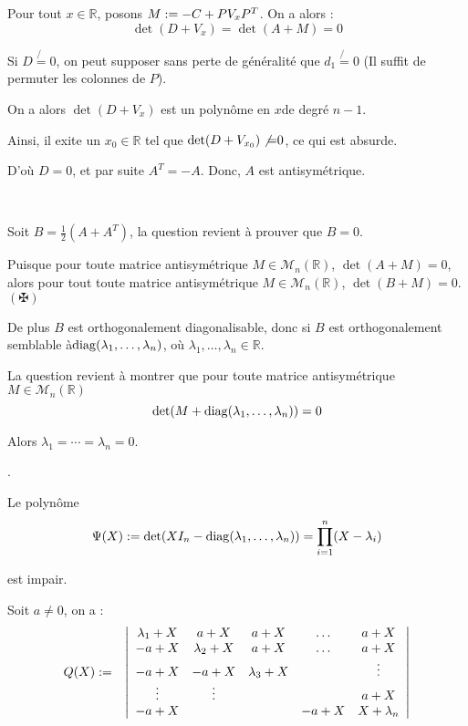 Pour tout $x \in \mathbb{R}$, posons $M := - C + P V_x P^T$. On a alors :
\[ \det (D + V_x) = \det (A + M) = 0 \]


Si $D \not{=} 0$, on peut supposer sans perte de g{\'e}n{\'e}ralit{\'e} que
$d_1 \not{=} 0$ (Il suffit de permuter les colonnes de $P$).

On a alors $\det (D + V_x)$ est un polyn{\^o}me en $x$de degr{\'e} $n - 1$.

Ainsi, il exite un $x_0 \in \mathbb{R}$ tel que $\det (D + V_{x_0})
\text{{\textsc{}}} \not{=} 0$, ce qui est absurde.

D'o{\`u} $D = 0$, et par suite $A^T = - A$. Donc, $A$ est antisym{\'e}trique.

\

{}

Soit $B = \frac{1}{2} (A + A^T)$, la question revient {\`a} prouver que $B =
0$.

Puisque pour toute matrice antisym{\'e}trique $M \in \mathcal{M}_n
(\mathbb{R})$, $\det (A + M) = 0$, alors pour tout toute matrice
antisym{\'e}trique $M \in \mathcal{M}_n (\mathbb{R})$, $\det (B + M) = 0$.
$(\maltese)$

De plus $B$ est orthogonalement diagonalisable, donc si $B$ est
orthogonalement semblable {\`a}\quad$\operatorname{diag} (\lambda_1, \ldots,
\lambda_n)$, o{\`u} $\lambda_1, \ldots, \lambda_n \in \mathbb{R}.$

La question revient {\`a} montrer que pour toute matrice antisym{\'e}trique $M
\in \mathcal{M}_n (\mathbb{R})$
\[ \det (M + \operatorname{diag} (\lambda_1, \ldots, \lambda_n)) = 0 \]


Alors $\lambda_1 = \cdots = \lambda_n = 0$.

.

Le polyn{\^o}me
\[ \Psi  (X) := \det (X I_n - \operatorname{diag} (\lambda_1, \ldots, \lambda_n))
   = \underset{i = 1}{\overset{n}{\prod}} (X - \lambda_i) \]


est impair.


Soit $a \neq 0$, on a :
\begin{eqnarray*}
  Q (X) & := & \left| \begin{array}{ccccc}
    \lambda_1 + X & a + X & a + X & \ldots & a + X\\
    - a + X & \lambda_2 + X & a + X & \ldots & a + X\\
    - a + X & - a + X & \lambda_3 + X &  & \vdots\\
    \vdots & \vdots &  &  & a + X\\
    - a + X &  &  & - a + X & X + \lambda_n
  \end{array} \right|
\end{eqnarray*}


